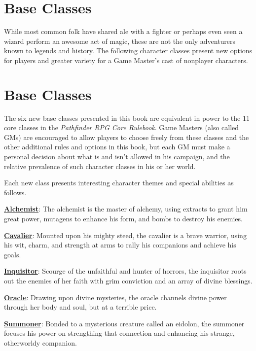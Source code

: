 \section{Base Classes}

While most common folk have shared ale with a fighter or perhaps even
seen a wizard perform an awesome act of magic, these are not the only
adventurers known to legends and history. The following character
classes present new options for players and greater variety for a Game
Master's cast of nonplayer characters.

\section{Base Classes}

The six new base classes presented in this book are equivalent in power
to the 11 core classes in the \emph{Pathfinder RPG Core Rulebook}. Game
Masters (also called GMs) are encouraged to allow players to choose
freely from these classes and the other additional rules and options in
this book, but each GM must make a personal decision about what is and
isn't allowed in his campaign, and the relative prevalence of such
character classes in his or her world.

Each new class presents interesting character themes and special
abilities as follows.

\textbf{\href{baseClasses/alchemist.html}{Alchemist}}: The alchemist is
the master of alchemy, using extracts to grant him great power, mutagens
to enhance his form, and bombs to destroy his enemies.

\textbf{\href{baseClasses/cavalier.html}{Cavalier}}: Mounted upon his
mighty steed, the cavalier is a brave warrior, using his wit, charm, and
strength at arms to rally his companions and achieve his goals.

\textbf{\href{baseClasses/inquisitor.html}{Inquisitor}}: Scourge of the
unfaithful and hunter of horrors, the inquisitor roots out the enemies
of her faith with grim conviction and an array of divine blessings.

\textbf{\href{baseClasses/oracle.html}{Oracle}}: Drawing upon divine
mysteries, the oracle channels divine power through her body and soul,
but at a terrible price.

\textbf{\href{baseClasses/summoner.html}{Summoner}}: Bonded to a
mysterious creature called an eidolon, the summoner focuses his power on
strengthing that connection and enhancing his strange, otherworldy
companion.


